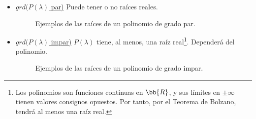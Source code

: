 \begin{ejemplo}
\begin{itemize}
    \item \underline{$grd(P(\lambda)$ par)} \qquad
    Puede tener o no raíces reales.
    \begin{figure}[H]
        \centering
        \caption{Ejemplos de las raíces de un polinomio de grado par.}
    \end{figure}

    \item \underline{$grd(P(\lambda)$ impar)} \qquad
    $P(\lambda)$ tiene, al menos, una raíz real\footnote{Los polinomios son funciones continuas en $\bb{R}$, y sus límites en $\pm \infty$ tienen valores consignos opuestos. Por tanto, por el Teorema de Bolzano, tendrá al menos una raíz real.}. Dependerá del polinomio.
    \begin{figure}[H]
        \centering
        \caption{Ejemplos de las raíces de un polinomio de grado impar.}
    \end{figure}
\end{itemize}
\end{ejemplo}

